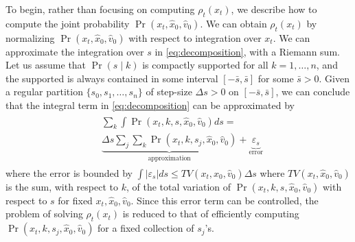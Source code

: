 \documentclass[letterpaper,10pt,conference]{ieeeconf}
\begin{document}
To begin, rather than focusing on computing $\rho_t(x_t)$, we describe how to compute the joint probability $\Pr( x_t , \hat{x}_0, \hat{v}_0)$.
We can obtain $\rho_t(x_t)$ by normalizing $\Pr( x_t , \hat{x}_0, \hat{v}_0)$ with respect to integration over $x_t$.
We can approximate the integration over $s$ in \eqref{eq:decomposition}, with a Riemann sum.
Let us assume that $\Pr(s \mid k)$ is compactly supported for all $k = 1,\dots,n$, and the supported is always contained
in some interval $[ - \bar{s} , \bar{s} ]$ for some $\bar{s} > 0$.
Given a regular partition $\{ s_0, s_1, \dots, s_n \}$ of step-size $\Delta s > 0$ on $[-\bar{s}, \bar{s}]$, 
we can conclude that the integral term in \eqref{eq:decomposition} can be approximated by
\begin{align}
	\begin{split}
	&\sum_{k} \int \Pr( x_t, k , s , \hat{x}_0, \hat{v}_0 ) ds = \\
	 &\underbrace{\Delta s \sum_{j} \sum_{k} \Pr( x_t, k , s_j , \hat{x}_0, \hat{v}_0)}_{\text{approximation}}
	  +
	  \underbrace{\varepsilon_s}_{\text{error}}
	 \end{split} \label{eq:approximation 0}
\end{align}
where the error is bounded by $\int| \varepsilon_s | ds \leq  TV(x_t, \hat{x}_0, \hat{v}_0) \Delta s$
where $TV(x_t, \hat{x}_0, \hat{v}_0)$ is the sum, with respect to $k$, of the total variation of $\Pr( x_t, k , s, \hat{x}_0, \hat{v}_0 )$ with respect to $s$ for fixed $x_t, \hat{x}_0, \hat{v}_0$.
Since this error term can be controlled, the problem of solving $\rho_t(x_t)$ is reduced to that of efficiently computing $ \Pr( x_t, k , s_j, \hat{x}_0, \hat{v}_0)$
for a fixed collection of $s_j$'s.
\end{document}
